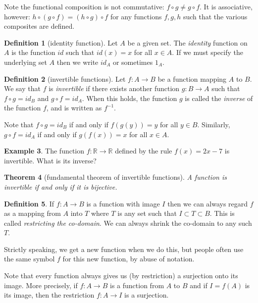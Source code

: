 \documentclass[11pt]{article}
\newtheorem{thm}{Theorem}[section]
\theoremstyle{definition}
\newtheorem{defn}[thm]{Definition}
\newtheorem{example}[thm]{Example}
\newcommand{\R}{\mathbb{R}} %
\newcommand{\compose}{\circ} %
\begin{document}
Note the functional composition is not commutative: $f \compose g \ne
g \compose f$. It is associative, however: $h \compose (g \compose f)
= (h \compose g) \compose f$ for any functions $f,g,h$ such that the
various composites are defined.


\begin{defn}[identity function]
Let $A$ be a given set. The {\em identity} function on $A$ is the
function $id$ such that $id(x)=x$ for all $x \in A$. If we must
specify the underlying set $A$ then we write $id_A$ or sometimes
$1_A$.
\end{defn}

\begin{defn}[invertible functions]
Let $f: A \to B$ be a function mapping $A$ to $B$. We say that $f$ is
{\em invertible} if there exists another function $g: B \to A$ such
that $f \compose g = id_B$ and $g \compose f = id_A$. When this holds,
the function $g$ is called the {\em inverse} of the function
$f$, and is written as $f^{-1}$.
\end{defn}

Note that $f \circ g = id_B$ if and only if $f(g(y))= y$ for all $y
\in B$. Similarly, $g \circ f = id_A$ if and only if $g(f(x))=x$ for
all $x \in A$.

\begin{example}
  The function $f: \R \to \R$ defined by the rule $f(x) = 2x-7$ is
  invertible. What is its inverse?
\end{example}


\begin{thm}[fundamental theorem of invertible functions]
%
  A function is invertible if and only if it is bijective.
\end{thm}

\begin{defn}
If $f: A \to B$ is a function with image $I$ then we can always regard
$f$ as a mapping from $A$ into $T$ where $T$ is any set such that $I
\subset T \subset B$.  This is called {\em restricting the
  co-domain}. We can always shrink the co-domain to any such $T$.
\end{defn}

Strictly speaking, we get a new function when we do this,
but people often use the same symbol $f$ for this new function, by
abuse of notation.

Note that every function always gives us (by restriction) a surjection
onto its image. More precisely, if $f: A \to B$ is a function from $A$
to $B$ and if $I = f(A)$ is its image, then the restriction $f:A \to
I$ is a surjection.
\end{document}
